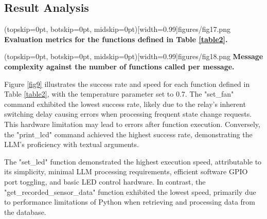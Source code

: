 \documentclass{ieeeaccess}
\begin{document}


\subsection{Result Analysis}
\Figure[b!](topskip=0pt, botskip=0pt,
midskip=0pt)[width=0.99\columnwidth]{{figures/fig17.png}}
{ \textbf{Evaluation metrics for the functions defined in Table \ref{table2}.}\label{fig9}}

\Figure[t!](topskip=0pt, botskip=0pt,
midskip=0pt)[width=0.99\columnwidth]{{figures/fig18.png}}
{ \textbf{Message complexity against the number of functions called per message.}\label{fig10}}


Figure \ref{fig9} illustrates the success rate and speed for each function defined in Table \ref{table2}, with the temperature parameter set to 0.7. The "set\_fan" command exhibited the lowest success rate, likely due to the relay's inherent switching delay causing errors when processing frequent state change requests. This hardware limitation may lead to errors after function execution. Conversely, the "print\_lcd" command achieved the highest success rate, demonstrating the LLM's proficiency with textual arguments.

The "set\_led" function demonstrated the highest execution speed, attributable to its simplicity, minimal LLM processing requirements, efficient software GPIO port toggling, and basic LED control hardware. In contrast, the "get\_recorded\_sensor\_data" function exhibited the lowest speed, primarily due to performance limitations of Python when retrieving and processing data from the database.
\end{document}
